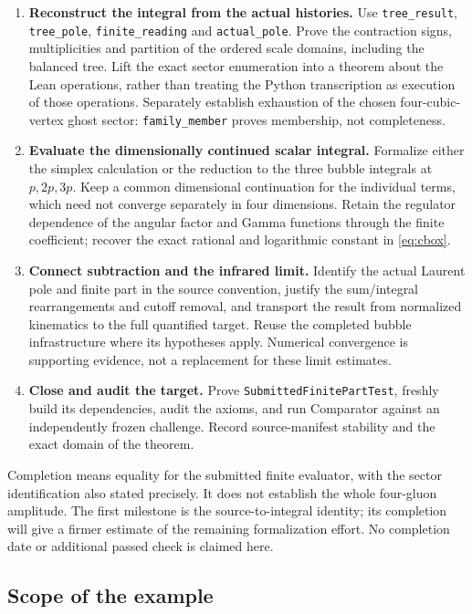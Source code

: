 \documentclass[11pt]{article}
\newcommand{\code}[1]{{\small\nolinkurl{#1}}}
\begin{document}
\begin{enumerate}
\item \textbf{Reconstruct the integral from the actual histories.}
Use \code{tree_result}, \code{tree_pole}, \code{finite_reading} and
\code{actual_pole}. Prove the contraction signs, multiplicities and partition
of the ordered scale domains, including the balanced tree. Lift the exact
sector enumeration into a theorem about the Lean operations, rather than
treating the Python transcription as execution of those operations.
Separately establish exhaustion of the chosen four-cubic-vertex ghost sector:
\code{family_member} proves membership, not completeness.
\item \textbf{Evaluate the dimensionally continued scalar integral.}
Formalize either the simplex calculation or the reduction to the three
bubble integrals at $p,2p,3p$. Keep a common dimensional continuation for
the individual terms, which need not converge separately in four dimensions.
Retain the regulator dependence of the angular factor and Gamma functions
through the finite coefficient; recover the exact rational and logarithmic
constant in \eqref{eq:cbox}.
\item \textbf{Connect subtraction and the infrared limit.}
Identify the actual Laurent pole and finite part in the source convention,
justify the sum/integral rearrangements and cutoff removal, and transport
the result from normalized kinematics to the full quantified target.
Reuse the completed bubble infrastructure where its hypotheses apply.
Numerical convergence is supporting evidence, not a replacement for these
limit estimates.
\item \textbf{Close and audit the target.}
Prove \code{SubmittedFinitePartTest}, freshly build its dependencies, audit
the axioms, and run Comparator against an independently frozen challenge.
Record source-manifest stability and the exact domain of the theorem.
\end{enumerate}

Completion means equality for the submitted finite evaluator, with the
sector identification also stated precisely. It does not establish the
whole four-gluon amplitude. The first milestone is the source-to-integral
identity; its completion will give a firmer estimate of the remaining
formalization effort. No completion date or additional passed check is
claimed here.

\subsection{Scope of the example}
\end{document}
